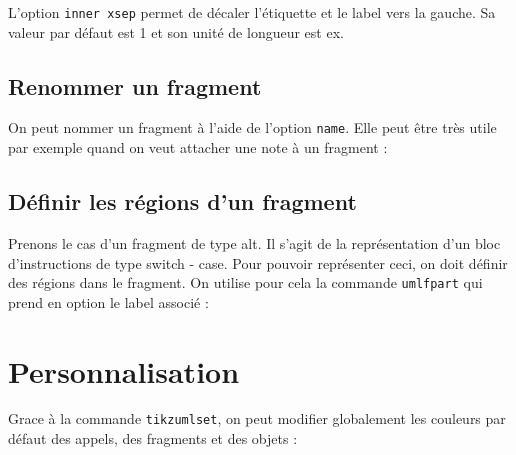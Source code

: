 \documentclass[a4paper,11pt]{report}
\newcommand{\inputTikZ}[1]{%
  }%
\newcommand{\inputTikZ}[1]{%
    \texttt{[image: fig/\#1.pdf]}%
  }%
\begin{document}
\medskip

L'option {\tt inner xsep} permet de décaler l'étiquette et le label vers la gauche. Sa valeur par défaut est 1 et son unité de longueur est ex.

\subsection{Renommer un fragment}\label{ss.fragname}

On peut nommer un fragment à l'aide de l'option {\tt name}. Elle peut être très utile par exemple quand on veut attacher une note à un fragment :

\medskip

\begin{minipage}{0.5\textwidth}

\end{minipage}
\begin{minipage}{0.5\textwidth}
\begin{center}
\inputTikZ{fragmentname}
\end{center}
\end{minipage}

\subsection{Définir les régions d'un fragment}\label{ss.fragpart}

Prenons le cas d'un fragment de type alt. Il s'agit de la représentation d'un bloc d'instructions de type switch - case. Pour pouvoir représenter ceci, on doit définir des régions dans le fragment. On utilise pour cela la commande {\tt umlfpart} qui prend en option le label associé :

\medskip

\begin{minipage}{0.5\textwidth}

\end{minipage}
\begin{minipage}{0.5\textwidth}
\begin{center}
\inputTikZ{fragmentpart}
\end{center}
\end{minipage}

\section{Personnalisation}\label{s.fitseq}

Grace à la commande {\tt tikzumlset}, on peut modifier globalement les couleurs par défaut des appels, des fragments et des objets :
\end{document}
